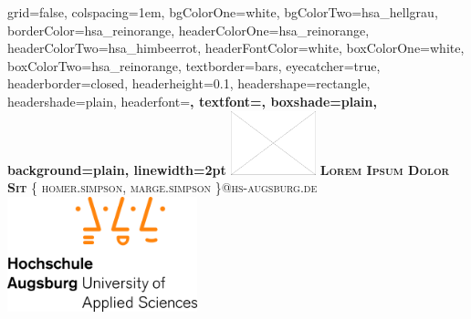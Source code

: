 \documentclass[portrait,final,a0paper,fontscale=0.177]{baposter}
\begin{document}



\begin{poster}%
  {
  grid=false,
  colspacing=1em,
  bgColorOne=white,
  bgColorTwo=hsa_hellgrau,
  borderColor=hsa_reinorange,
  headerColorOne=hsa_reinorange,
  headerColorTwo=hsa_himbeerrot,
  headerFontColor=white,
  boxColorOne=white,
  boxColorTwo=hsa_reinorange,
  textborder=bars,
  eyecatcher=true,
  headerborder=closed,
  headerheight=0.1\textheight,
  headershape=rectangle,
  headershade=plain,
  headerfont=\Large\bf\sc, %
  textfont={\sf\setlength{\parindent}{1.5em}},
  boxshade=plain,
  background=plain,
  linewidth=2pt
  }
  {
  \includegraphics[height=5em]{images/platzhalter_horizontal}
  } 
  {\bf\textsc{Lorem Ipsum Dolor Sit}\vspace{0.5em}}
  {\textsc{\{ homer.simpson, marge.simpson \}@hs-augsburg.de}}
  {%
    \includegraphics[height=9.0em]{images/hsa_logo_normal.jpg}
}
\end{poster}
\end{document}
